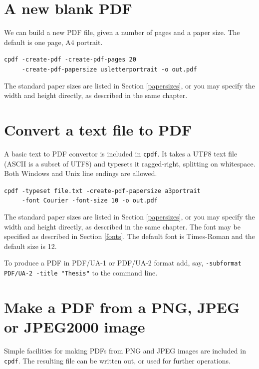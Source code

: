 \documentclass{book}
\begin{document}
\section{A new blank PDF}

We can build a new PDF file, given a number of pages and a paper size. The default is one page, A4 portrait.

\begin{framed}
 \noindent\small\verb?cpdf -create-pdf -create-pdf-pages 20?\\
 \noindent\small\verb?     -create-pdf-papersize usletterportrait -o out.pdf?
\end{framed}

\noindent The standard paper sizes are listed in Section \ref{papersizes}, or you may specify the width and height directly, as described in the same chapter.

\section{Convert a text file to PDF}
A basic text to PDF convertor is included in \texttt{cpdf}. It takes a UTF8 text file (ASCII is a subset of UTF8) and typesets it ragged-right, splitting on whitespace. Both Windows and Unix line endings are allowed. 

\begin{framed}
 \noindent\small\verb?cpdf -typeset file.txt -create-pdf-papersize a3portrait?\\
 \noindent\small\verb?     -font Courier -font-size 10 -o out.pdf?
\end{framed}

\noindent The standard paper sizes are listed in Section \ref{papersizes}, or you may specify the width and height directly, as described in the same chapter. The font may be specified as described in Section \ref{fonts}. The default font is Times-Roman and the default size is 12.

To produce a PDF in PDF/UA-1 or PDF/UA-2 format add, say, \texttt{-subformat PDF/UA-2 -title "Thesis"} to the command line.

\section{Make a PDF from a PNG, JPEG or JPEG2000 image}

Simple facilities for making PDFs from PNG and JPEG images are included in \texttt{cpdf}. The resulting file can be written out, or used for further operations.
\end{document}
